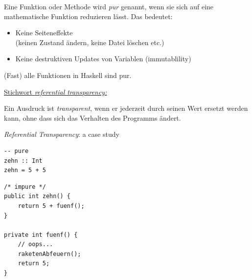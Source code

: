 \documentclass[unknownkeysallowed]{beamer}
\begin{document}
\begin{frame}

Eine Funktion oder Methode wird \emph{\glqq pur\grqq} genannt, wenn sie sich auf eine mathematische Funktion reduzieren lässt. Das bedeutet: \pause

\begin{itemize}
\item Keine Seiteneffekte\\ (keinen Zustand ändern, keine Datei löschen etc.) \pause
\item Keine destruktiven Updates von Variablen (immutablility)\pause
\end{itemize}

(Fast) alle Funktionen in Haskell sind pur.\bigskip

\pause

\underline{Stichwort \emph{referential transparency:}}

Ein Ausdruck ist \emph{transparent}, wenn er jederzeit durch seinen Wert ersetzt werden kann, ohne dass sich das Verhalten des Programms ändert.

\end{frame}


\begin{frame}[fragile]

\emph{Referential Transparency}: a case study

\begin{multicols}{2}
\begin{verbatim}
-- pure
zehn :: Int
zehn = 5 + 5
\end{verbatim}

\pause
\columnbreak

\begin{verbatim}
/* impure */
public int zehn() {
    return 5 + fuenf();
}

private int fuenf() {
    // oops...
    raketenAbfeuern();
    return 5;
}
\end{verbatim}
\end{multicols}
\end{frame}

\end{document}
